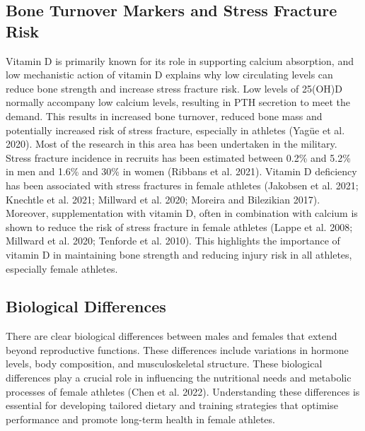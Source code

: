\documentclass[
]{article}
\begin{document}
\subsection{Bone Turnover Markers and Stress Fracture Risk}\label{bone-turnover-markers-and-stress-fracture-risk}

Vitamin D is primarily known for its role in supporting calcium absorption, and low mechanistic action of vitamin D explains why low circulating levels can reduce bone strength and increase stress fracture risk. Low levels of 25(OH)D normally accompany low calcium levels, resulting in PTH secretion to meet the demand. This results in increased bone turnover, reduced bone mass and potentially increased risk of stress fracture, especially in athletes (Yagüe et al. 2020). Most of the research in this area has been undertaken in the military. Stress fracture incidence in recruits has been estimated between 0.2\% and 5.2\% in men and 1.6\% and 30\% in women (Ribbans et al. 2021). Vitamin D deficiency has been associated with stress fractures in female athletes (Jakobsen et al. 2021; Knechtle et al. 2021; Millward et al. 2020; Moreira and Bilezikian 2017). Moreover, supplementation with vitamin D, often in combination with calcium is shown to reduce the risk of stress fracture in female athletes (Lappe et al. 2008; Millward et al. 2020; Tenforde et al. 2010). This highlights the importance of vitamin D in maintaining bone strength and reducing injury risk in all athletes, especially female athletes.

\subsection{Biological Differences}\label{biological-differences}

There are clear biological differences between males and females that extend beyond reproductive functions. These differences include variations in hormone levels, body composition, and musculoskeletal structure. These biological differences play a crucial role in influencing the nutritional needs and metabolic processes of female athletes (Chen et al. 2022). Understanding these differences is essential for developing tailored dietary and training strategies that optimise performance and promote long-term health in female athletes.
\end{document}
